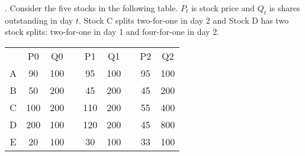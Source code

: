 \documentclass[11.5pt]{article}
\begin{document}
\newcommand*\ruleline[1]{\par\noindent\raisebox{.8ex}{\makebox[\linewidth]{\hrulefill\hspace{1ex}\raisebox{-.8ex}{#1}\hspace{1ex}\hrulefill}}}

\renewcommand{\headheight}{0.7in}
\setlength{\headwidth}{\textwidth}
\renewcommand{\footrulewidth}{0.4pt}
\fancyfoot[L]{\sc{}}
\pagestyle{fancy}
\vspace{1.5cm}
\onehalfspacing

\begin{center}
\large{\textbf{}}
\vspace{1.0cm}
\end{center}



\vspace{20pt}


. Consider the five stocks in the following table. $P_t$ is stock price and $Q_t$ is shares outstanding in day $t$. Stock C splits two-for-one in day 2 and Stock D has two stock splits: two-for-one in day 1 and four-for-one in day 2. \\


\begin{table}[h]
	\begin{tabular}{ccccccccc}
		\hline
		& P0  & Q0  &  & P1  & Q1  &  & P2 & Q2  \\ \cline{1-3} \cline{5-6} \cline{8-9} 
		A & 90  & 100 &  & 95  & 100 &  & 95 & 100 \\
		B & 50  & 200 &  & 45  & 200 &  & 45 & 200 \\
		C & 100 & 200 &  & 110 & 200 &  & 55 & 400 \\
		D & 200 & 100 &  & 120 & 200 &  & 45 & 800 \\
		E & 20  & 100 &  & 30  & 100 &  & 33 & 100 \\ \hline
	\end{tabular}
\end{table}
\end{document}

